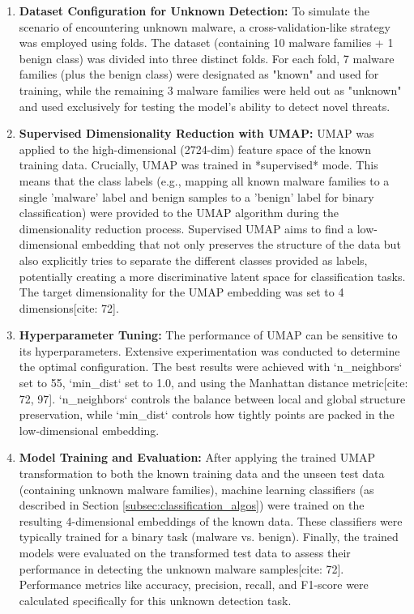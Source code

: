 \begin{enumerate}
    \item \textbf{Dataset Configuration for Unknown Detection:} To simulate the scenario of encountering unknown malware, a cross-validation-like strategy was employed using folds. The dataset (containing 10 malware families + 1 benign class) was divided into three distinct folds. For each fold, 7 malware families (plus the benign class) were designated as "known" and used for training, while the remaining 3 malware families were held out as "unknown" and used exclusively for testing the model's ability to detect novel threats.
    \item \textbf{Supervised Dimensionality Reduction with UMAP:} UMAP was applied to the high-dimensional (2724-dim) feature space of the known training data. Crucially, UMAP was trained in *supervised* mode. This means that the class labels (e.g., mapping all known malware families to a single 'malware' label and benign samples to a 'benign' label for binary classification) were provided to the UMAP algorithm during the dimensionality reduction process. Supervised UMAP aims to find a low-dimensional embedding that not only preserves the structure of the data but also explicitly tries to separate the different classes provided as labels, potentially creating a more discriminative latent space for classification tasks. The target dimensionality for the UMAP embedding was set to 4 dimensions[cite: 72].
    \item \textbf{Hyperparameter Tuning:} The performance of UMAP can be sensitive to its hyperparameters. Extensive experimentation was conducted to determine the optimal configuration. The best results were achieved with `n_neighbors` set to 55, `min_dist` set to 1.0, and using the Manhattan distance metric[cite: 72, 97]. `n_neighbors` controls the balance between local and global structure preservation, while `min_dist` controls how tightly points are packed in the low-dimensional embedding.
    \item \textbf{Model Training and Evaluation:} After applying the trained UMAP transformation to both the known training data and the unseen test data (containing unknown malware families), machine learning classifiers (as described in Section \ref{subsec:classification_algos}) were trained on the resulting 4-dimensional embeddings of the known data. These classifiers were typically trained for a binary task (malware vs. benign). Finally, the trained models were evaluated on the transformed test data to assess their performance in detecting the unknown malware samples[cite: 72]. Performance metrics like accuracy, precision, recall, and F1-score were calculated specifically for this unknown detection task.
\end{enumerate}

